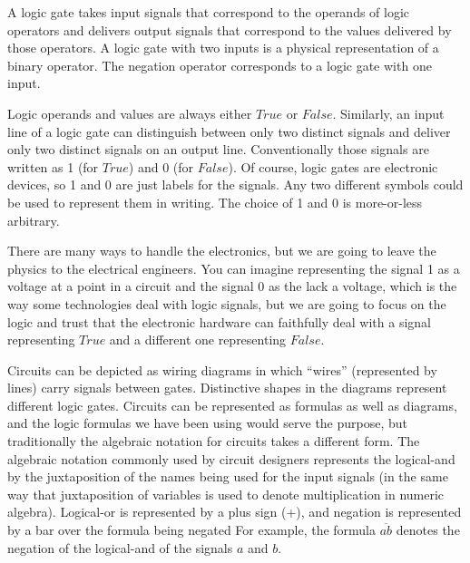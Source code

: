 A logic gate takes input signals that correspond
to the operands of logic operators and delivers output signals
that correspond to the values delivered by those operators.
A logic gate with two inputs is a physical representation of
a binary operator. The negation operator corresponds to a
logic gate with one input.

Logic operands and values are always either $True$ or $False$.
Similarly, an input line of a logic gate can distinguish between
only two distinct signals
and deliver only two distinct signals on an output line.
Conventionally those signals are written as 1 (for $True$) and 0 (for $False$).
Of course, logic gates are electronic devices,
so 1 and 0 are just labels for the signals.
Any two different symbols could be used to represent them in writing.
The choice of 1 and 0 is more-or-less arbitrary.

There are many ways to handle the electronics,
but we are going to leave the physics to the electrical engineers.
You can imagine representing the signal 1 as
a voltage at a point in a circuit and the signal 0 as
the lack a voltage, which is the way some technologies
deal with logic signals,
but we are going to focus on the logic and trust that
the electronic hardware can faithfully deal with
a signal representing $True$ and a different one representing $False$.

Circuits
can be depicted as wiring diagrams
in which ``wires'' (represented by lines) carry signals between gates.
Distinctive shapes in the diagrams represent different logic gates.
Circuits can be represented as formulas as well as diagrams, and
the logic formulas we have been using would serve the purpose,
but traditionally the algebraic notation for circuits takes a
different form.
The algebraic notation commonly used by circuit
designers represents the logical-and by the juxtaposition
of the names being used for the input signals (in the same way
that juxtaposition of variables is used to denote multiplication
in numeric algebra). Logical-or is represented by a plus sign (+),
and negation is represented by a bar over the formula being negated
For example, the formula $\overline{ab}$ denotes the negation of the logical-and
of the signals $a$ and $b$.

